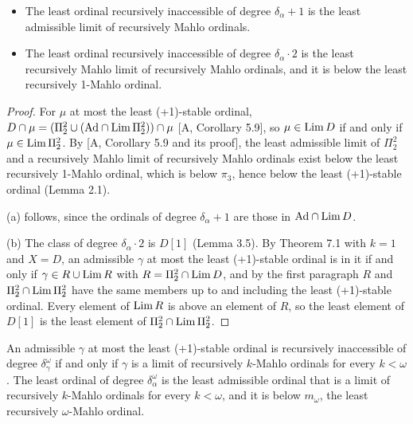 \documentclass[11pt]{article}
\begin{document}
\begin{statement}
\begin{itemize}
\item[(a)] The least ordinal recursively inaccessible of degree $\delta_\alpha + 1$ is the least admissible limit of
  recursively Mahlo ordinals.
\item[(b)] The least ordinal recursively inaccessible of degree $\delta_\alpha \cdot 2$ is the least recursively Mahlo
  limit of recursively Mahlo ordinals, and it is below the least recursively 1-Mahlo ordinal.
\end{itemize}
\end{statement}

\begin{proof}
For $\mu$ at most the least (+1)-stable ordinal, $D \cap \mu = (\Pi_2^2 \cup (\mathrm{Ad} \cap \mathrm{Lim}\, \Pi_2^2)) \cap \mu$ [A, Corollary 5.9], so $\mu \in \mathrm{Lim}\, D$
if and only if $\mu \in \mathrm{Lim}\, \Pi_2^2$. By [A, Corollary 5.9 and its proof], the least admissible limit of $\Pi_2^2$ and a
recursively Mahlo limit of recursively Mahlo ordinals exist below the least recursively 1-Mahlo ordinal, which is
below $\pi_3$, hence below the least (+1)-stable ordinal (Lemma 2.1).

(a) follows, since the ordinals of degree $\delta_\alpha + 1$ are those in $\mathrm{Ad} \cap \mathrm{Lim}\, D$.

(b) The class of degree $\delta_\alpha \cdot 2$ is $D[1]$ (Lemma 3.5). By Theorem 7.1 with $k = 1$ and $X = D$, an
admissible $\gamma$ at most the least (+1)-stable ordinal is in it if and only if $\gamma \in R \cup \mathrm{Lim}\, R$ with $R =
\Pi_2^2 \cap \mathrm{Lim}\, D$, and by the first paragraph $R$ and $\Pi_2^2 \cap \mathrm{Lim}\, \Pi_2^2$ have the same members up to and
including the least (+1)-stable ordinal. Every element of $\mathrm{Lim}\, R$ is above an
element of $R$, so the least element of $D[1]$ is the least element of $\Pi_2^2 \cap \mathrm{Lim}\, \Pi_2^2$.
\end{proof}

\begin{statement} An admissible $\gamma$ at most the least (+1)-stable
ordinal is recursively inaccessible of degree $\delta_\gamma^\omega$ if and only if $\gamma$ is a limit of
recursively $k$-Mahlo ordinals for every $k < \omega$. The least ordinal of degree $\delta_\alpha^\omega$ is the least
admissible ordinal that is a limit of recursively $k$-Mahlo ordinals for every $k < \omega$, and it is below $m_\omega$,
the least recursively $\omega$-Mahlo ordinal.
\end{statement}
\end{document}

